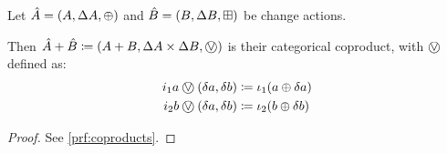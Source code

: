 \begin{prop}[name=Coproducts, restate=coproducts]
  \label{prop:coproducts}
  Let $\hat{A} = (A,\Delta A,\oplus)$ and $\hat{B} =
  (B,\Delta B,\boxplus)$ be change actions.

  Then $\cstr{A} + \cstr{B} \defeq \cstruct{A + B}{\changes{A} \times
  \changes{B}}{\cplusvee}$ is their categorical coproduct, with $\cplusvee$ defined as:
  \begin{align*}
    i_1 a \cplusvee (\change{a}, \change{b}) &\defeq \iota_1 (a \cplus \change{a})\\
    i_2 b \cplusvee (\change{a}, \change{b}) &\defeq \iota_2 (b \cplus \change{b})
  \end{align*}
\end{prop}
\ifproofs
\begin{proof}
  See \cref{prf:coproducts}.
\end{proof}
\fi

